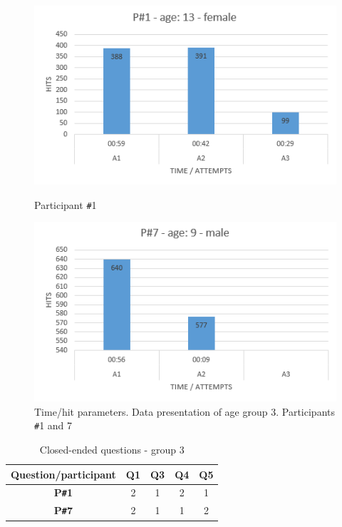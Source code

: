 \begin{figure}[!ht]
    \centering
    \includegraphics[width=.6\textwidth]{figures/p1.png}
     \caption{Participant \texttt{\#}1}
    \includegraphics[width=.6\textwidth]{figures/p7.png}
    \caption{Time/hit parameters. Data presentation of age group 3. Participants \texttt{\#}1 and 7}

    \label{fig:agegroup3}
\end{figure}

\begin{table}[!ht]
    \centering
    \begin{tabular}{c|c|c|c|c}
    \hline
    \multicolumn{1}{|c|}{\textbf{Question/participant}} &
    \multicolumn{1}{c|}{\textbf{Q1}} &
    \multicolumn{1}{c|}{\textbf{Q3}} &
    \multicolumn{1}{c|}{\textbf{Q4}} &
    \multicolumn{1}{c|}{\textbf{Q5}} \\ \hline
    \multicolumn{1}{|c|}{\textbf{P\texttt{\#}1}} &
    \multicolumn{1}{c|}{2} &
    \multicolumn{1}{c|}{1} &
    \multicolumn{1}{c|}{2} &
    \multicolumn{1}{c|}{1} \\ \hline
    \multicolumn{1}{|c|}{\textbf{P\texttt{\#}7}} &
    \multicolumn{1}{c|}{2} &
    \multicolumn{1}{c|}{1} &
    \multicolumn{1}{c|}{1} &
    \multicolumn{1}{c|}{2} \\ \hline
    \end{tabular}
    \caption{Closed-ended questions - group 3}
    \label{tab:closedendedquestiongroup3}
\end{table}

